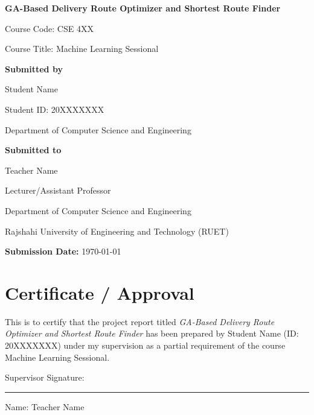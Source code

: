 \documentclass[12pt,a4paper]{report}
\begin{document}
\begin{titlepage}
    \centering
    \vspace*{1.2cm}

    {\LARGE \textbf{GA-Based Delivery Route Optimizer and Shortest Route Finder} \par}
    \vspace{1.2cm}

    {\Large Course Code: CSE 4XX \par}
    {\Large Course Title: Machine Learning Sessional \par}
    \vspace{1.5cm}

    \textbf{Submitted by} \par
    Student Name \par
    Student ID: 20XXXXXXX \par
    Department of Computer Science and Engineering \par
    \vspace{1.0cm}

    \textbf{Submitted to} \par
    Teacher Name \par
    Lecturer/Assistant Professor \par
    Department of Computer Science and Engineering \par
    \vspace{1.2cm}

    Rajshahi University of Engineering and Technology (RUET) \par
    \vfill

    \textbf{Submission Date:} \today
\end{titlepage}

\chapter*{Certificate / Approval}
This is to certify that the project report titled \textit{GA-Based Delivery Route Optimizer and Shortest Route Finder} has been prepared by Student Name (ID: 20XXXXXXX) under my supervision as a partial requirement of the course Machine Learning Sessional.

\vspace{2cm}
\noindent Supervisor Signature: \rule{6cm}{0.4pt}

\vspace{1cm}
\noindent Name: Teacher Name
\end{document}
